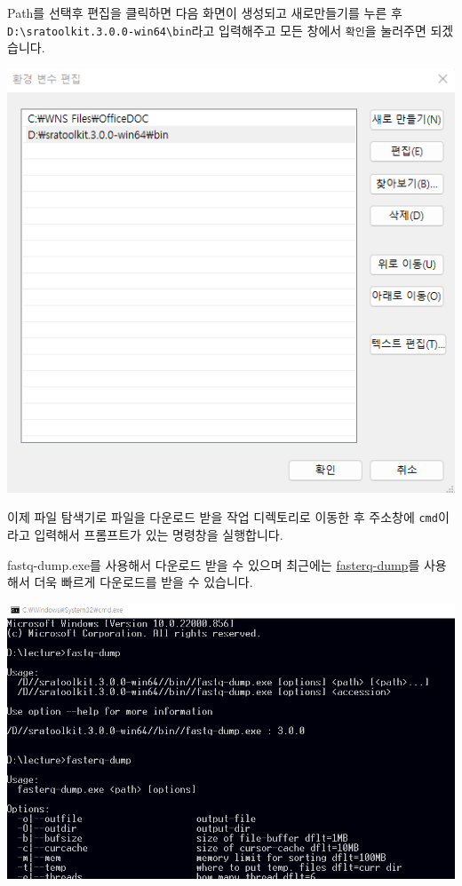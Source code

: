 \documentclass[
]{book}
\begin{document}
Path를 선택후 편집을 클릭하면 다음 화면이 생성되고 새로만들기를 누른 후 \texttt{D:\textbackslash{}sratoolkit.3.0.0-win64\textbackslash{}bin}라고 입력해주고 모든 창에서 \texttt{확인}을 눌러주면 되겠습니다.

\includegraphics{images/12/env2.png}

이제 파일 탐색기로 파일을 다운로드 받을 작업 디렉토리로 이동한 후 주소창에 \texttt{cmd}이라고 입력해서 프롬프트가 있는 명령창을 실행합니다.

fastq-dump.exe를 사용해서 다운로드 받을 수 있으며 최근에는 \href{https://github.com/ncbi/sra-tools/wiki/HowTo:-fasterq-dump}{fasterq-dump}를 사용해서 더욱 빠르게 다운로드를 받을 수 있습니다.

\includegraphics[width=6.25in,height=\textheight]{images/12/sra.png}
\end{document}
